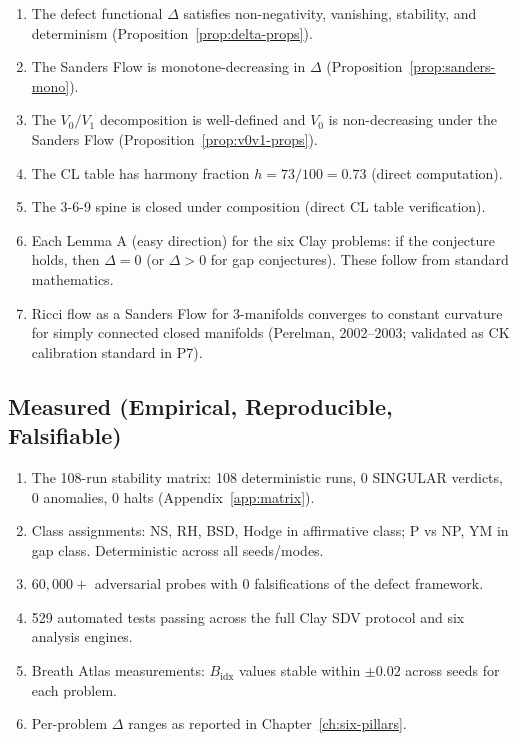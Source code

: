 \documentclass[12pt, openany]{book}
\theoremstyle{remark}
\begin{document}
\begin{enumerate}
  \item The defect functional $\Delta$ satisfies non-negativity, vanishing,
        stability, and determinism (Proposition~\ref{prop:delta-props}).
  \item The Sanders Flow is monotone-decreasing in $\Delta$
        (Proposition~\ref{prop:sanders-mono}).
  \item The $V_0/V_1$ decomposition is well-defined and $V_0$ is non-decreasing
        under the Sanders Flow (Proposition~\ref{prop:v0v1-props}).
  \item The CL table has harmony fraction $h = 73/100 = 0.73$
        (direct computation).
  \item The 3-6-9 spine is closed under composition (direct CL table verification).
  \item Each Lemma A (easy direction) for the six Clay problems: if the conjecture
        holds, then $\Delta = 0$ (or $\Delta > 0$ for gap conjectures). These
        follow from standard mathematics.
  \item Ricci flow as a Sanders Flow for 3-manifolds converges to constant curvature
        for simply connected closed manifolds (Perelman, 2002--2003; validated as
        CK calibration standard in P7).
\end{enumerate}

\subsection{Measured (Empirical, Reproducible, Falsifiable)}

\begin{enumerate}
  \item The 108-run stability matrix: 108 deterministic runs, 0 SINGULAR verdicts,
        0 anomalies, 0 halts (Appendix~\ref{app:matrix}).
  \item Class assignments: NS, RH, BSD, Hodge in affirmative class;
        P vs NP, YM in gap class. Deterministic across all seeds/modes.
  \item $60{,}000{+}$ adversarial probes with 0 falsifications of the defect
        framework.
  \item 529 automated tests passing across the full Clay SDV protocol and
        six analysis engines.
  \item Breath Atlas measurements: $B_{\mathrm{idx}}$ values stable within
        $\pm 0.02$ across seeds for each problem.
  \item Per-problem $\Delta$ ranges as reported in Chapter~\ref{ch:six-pillars}.
\end{enumerate}
\end{document}
